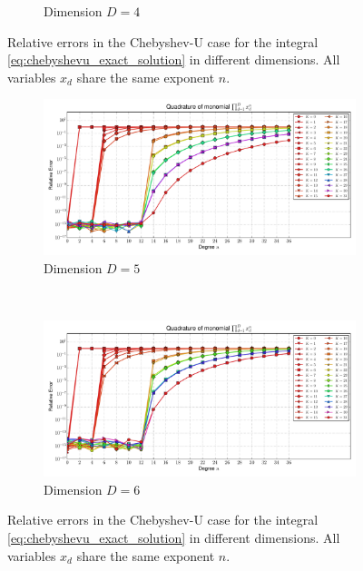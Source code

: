 \documentclass[a4paper,10pt]{article}
\begin{document}
\begin{figure}
\begin{subfigure}[b]{\linewidth}
    \caption{Dimension $D=4$}
    \label{fig:monomial_errors_chebyshevu_multivariate_dimension_4}
  \end{subfigure}
  \caption{Relative errors in the Chebyshev-U case for the integral \eqref{eq:chebyshevu_exact_solution}
    in different dimensions. All variables $x_d$ share the same exponent $n$.}
  \label{fig:monomial_errors_chebyshevu_multivariate_a}
\end{figure}

\begin{figure}
  \begin{subfigure}[b]{\linewidth}
    \centering
    \includegraphics[width=\linewidth]{./img/monomial_errors_chebyshevu_multivariate_dimension_5.pdf}
    \caption{Dimension $D=5$}
    \label{fig:monomial_errors_chebyshevu_multivariate_dimension_5}
  \end{subfigure} \\
  \begin{subfigure}[b]{\linewidth}
    \centering
    \includegraphics[width=\linewidth]{./img/monomial_errors_chebyshevu_multivariate_dimension_6.pdf}
    \caption{Dimension $D=6$}
    \label{fig:monomial_errors_chebyshevu_multivariate_dimension_6}
  \end{subfigure}
  \caption{Relative errors in the Chebyshev-U case for the integral \eqref{eq:chebyshevu_exact_solution}
    in different dimensions. All variables $x_d$ share the same exponent $n$.}
  \label{fig:monomial_errors_chebyshevu_multivariate_b}
\end{figure}
\end{document}
